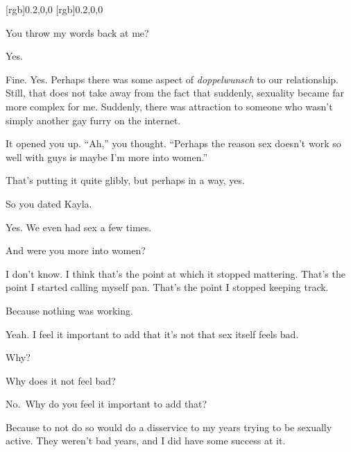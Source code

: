 [rgb]{0.2,0,0}
[rgb]{0.2,0,0}
\begin{paracol}{2}
  \begin{rightcolumn*}
    
  \end{rightcolumn*}
  \begin{leftcolumn}
\noindent You throw my words back at me?


\begin{ally}
Yes.
\end{ally}
Fine. Yes. Perhaps there was some aspect of \emph{doppelwunsch} to our relationship. Still, that does not take away from the fact that suddenly, sexuality became far more complex for me. Suddenly, there was attraction to someone who wasn't simply another gay furry on the internet.

\begin{ally}
It opened you up. ``Ah,'' you thought. ``Perhaps the reason sex doesn't work so well with guys is maybe I'm more into women.''
\end{ally}
That's putting it quite glibly, but perhaps in a way, yes.

\begin{ally}
So you dated Kayla.
\end{ally}
Yes. We even had sex a few times.

\begin{ally}
And were you more into women?
\end{ally}
I don't know. I think that's the point at which it stopped mattering. That's the point I started calling myself pan. That's the point I stopped keeping track.

\begin{ally}
Because nothing was working.
\end{ally}
Yeah.
\newpage
\noindent I feel it important to add that it's not that sex itself feels bad.

\begin{ally}
Why?
\end{ally}
Why does it not feel bad?

\begin{ally}
No.~Why do you feel it important to add that?
\end{ally}
Because to not do so would do a disservice to my years trying to be sexually active. They weren't bad years, and I did have some success at it.


\end{leftcolumn}
\end{paracol}
